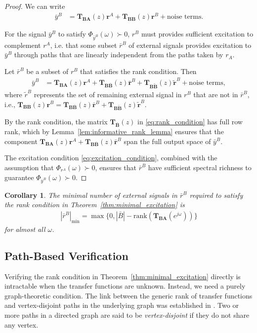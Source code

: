 \documentclass[11pt,a4paper]{article}
\newtheorem{corollary}{Corollary}[theorem]
\begin{document}
\begin{proof}
    We can write
\begin{align*}
    \bar y^B &= \mathbf{T_{BA}}(z) \mathbf r^A + \mathbf{T_{BB}}(z) \mathbf r^B + \text{noise terms}.
\end{align*}

For the signal $\bar y^B$ to satisfy $\Phi_{\bar y^B}(\omega) \succ 0$, $ r^B$ must provides sufficient excitation to complement $r^A$, i.e. that some subset $\bar r^B$ of external signals provides excitation to $\bar y^B$ through paths that are linearly independent from the paths taken by $r_A$.

Let $\bar r^B$ be a subset of $r^B$ that satisfies the rank condition. Then
\begin{align*}
   \bar y^B &= \mathbf{T_{BA}}(z) \mathbf r^A + \mathbf{T_{B\bar B}}(z) \mathbf{\bar r}^B + \mathbf{T_{B\tilde B}}(z) \mathbf{\tilde r}^{B} + \text{noise terms},
\end{align*}
where $\tilde r^{ B}$ represents the set of remaining external signal in $r^B$ that are not in $\bar r ^B$, i.e., $\mathbf{T_{BB}}(z) \mathbf r^B = \mathbf{T_{B\bar B}}(z) \mathbf{\bar r}^B + \mathbf{T_{B\tilde B}}(z) \mathbf{\tilde r}^{B}$.

By the rank condition, the matrix $\mathbf{T_{\bar B}}(z)$ in \eqref{eq:rank_condition} has full row rank, which by Lemma~\ref{lem:informative_rank_lemma} ensures that the component $\mathbf{T_{BA}}(z) \mathbf r^A + \mathbf{T_{B\bar B}}(z) \mathbf{\bar r}^B$ span the full output space of $\bar y^B$.

The excitation condition \eqref{eq:excitation_condition}, combined with the assumption that $\Phi_{r^A}(\omega) \succ 0$, ensures that $\bar r^B$ have sufficient spectral richness to guarantee $\Phi_{\bar y^B}(\omega) \succ 0$.
\end{proof}


\begin{corollary}\label{cor:minimal_subset}
The minimal number of external signals in $\bar r^B$ required to satisfy the rank condition in Theorem~\ref{thm:minimal_excitation} is
\begin{align*}
    |\bar r^B|_{\min} = \max\{0, |\bar B| - \text{rank}(\mathbf{T_{BA}}(e^{j\omega}))\}
\end{align*}
for almost all $\omega$.
\end{corollary}



\subsection{Path-Based Verification}
Verifying the rank condition in Theorem~\ref{thm:minimal_excitation} directly is intractable when the transfer functions are unknown. Instead, we need a purely graph-theoretic condition. The link between the generic rank of transfer functions and vertex-disjoint paths in the underlying graph was established in \cite{graph_TF_rank}. Two or more paths in a directed graph are said to be \emph{vertex-disjoint} if they do not share any vertex.
\end{document}
